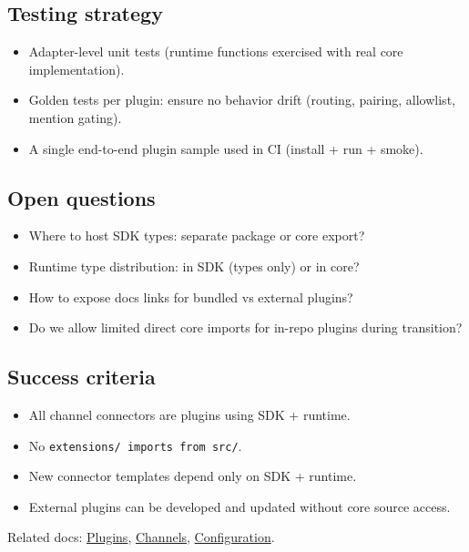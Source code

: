 \subsection{Testing strategy}


\begin{itemize}
  \item Adapter-level unit tests (runtime functions exercised with real core implementation).
  \item Golden tests per plugin: ensure no behavior drift (routing, pairing, allowlist, mention gating).
  \item A single end-to-end plugin sample used in CI (install + run + smoke).
\end{itemize}


\subsection{Open questions}


\begin{itemize}
  \item Where to host SDK types: separate package or core export?
  \item Runtime type distribution: in SDK (types only) or in core?
  \item How to expose docs links for bundled vs external plugins?
  \item Do we allow limited direct core imports for in-repo plugins during transition?
\end{itemize}


\subsection{Success criteria}


\begin{itemize}
  \item All channel connectors are plugins using SDK + runtime.
  \item No \texttt{extensions/\textbf{} imports from \texttt{src/}}.
  \item New connector templates depend only on SDK + runtime.
  \item External plugins can be developed and updated without core source access.
\end{itemize}


Related docs: \href{/tools/plugin}{Plugins}, \href{/channels/index}{Channels}, \href{/gateway/configuration}{Configuration}.


\clearpage

